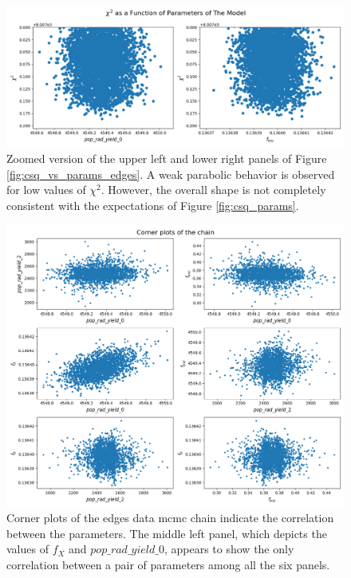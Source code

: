 \documentclass[12pt, TexShade, letterpaper]{report}
\begin{document}
\begin{figure}[h!]
\centering
\includegraphics[scale =0.5]{csq_vs_params_zoomed_edges.png}
\caption[Chi-Square of Drawn samples as a function of parameter values for the \gls{edges} data, zoomed version]{Zoomed version of the upper left and lower right panels of Figure \ref{fig:csq_vs_params_edges}. A weak parabolic behavior is observed for low values of $\chi^2$. However, the overall shape is not completely consistent with the expectations of Figure \ref{fig:csq_params}.}
\label{fig:csq_vs_params_zoomed_edges}
\end{figure}


\begin{figure}[h!]
\centering
\includegraphics[scale =0.5]{corner_plots_edges.png}
\caption[Corner plots of the \gls{edges} data \gls{mcmc} chain]{Corner plots of the \gls{edges} data \gls{mcmc} chain indicate the correlation between the parameters. The middle left panel, which depicts the values of $f_X$ and $pop\_rad\_yield\_0$, appears to show the only correlation between a pair of parameters among all the six panels.}
\label{fig:corner_plots_edges}
\end{figure}
\end{document}
